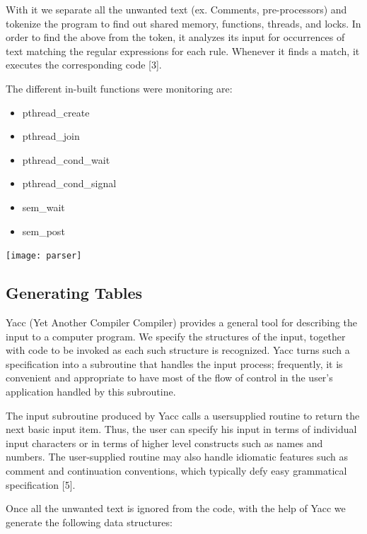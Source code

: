 With it we separate all the unwanted text (ex. Comments, pre-processors) and tokenize the program to find out shared memory, functions, threads, and locks. In order to find the above from the token, it analyzes its input for occurrences of text matching the regular expressions for each rule. Whenever it finds a match, it executes the corresponding code [3].

The different in-built functions were monitoring are:\\
\begin{itemize}
\item pthread\_create\\
\item pthread\_join\\
\item pthread\_cond\_wait\\
\item pthread\_cond\_signal\\
\item sem\_wait\\
\item sem\_post\\
\end{itemize}
\texttt{[image: parser]}\\[0.5c]

\subsection{Generating Tables}
Yacc (Yet Another Compiler Compiler) provides a general tool for describing the input to a computer program. We specify the structures of the input, together with code to be invoked as each such structure is recognized. Yacc turns such a specification into a subroutine that handles the input process; frequently, it is convenient and appropriate to have most of the flow of control in the user's application handled by this subroutine.

The input subroutine produced by Yacc calls a usersupplied routine to return the next basic input item. Thus, the user can specify his input in terms of individual input characters or in terms of higher level constructs such as names and numbers. The user-supplied routine may also handle idiomatic features such as comment and continuation conventions, which typically defy easy grammatical specification [5]. 

Once all the unwanted text is ignored from the code, with the help of Yacc we generate the following data structures:

